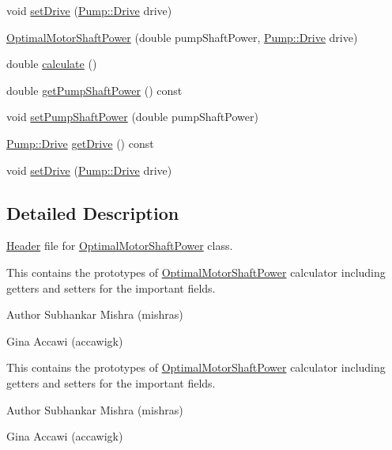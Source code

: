 \begin{DoxyCompactItemize}
\item 
void \hyperlink{class_optimal_motor_shaft_power_abd88cbdcba70dbb194a8f957b4467fc7}{set\+Drive} (\hyperlink{class_pump_a32bf0ade131a11bb3b3fb374f638e983}{Pump\+::\+Drive} drive)
\item 
\hyperlink{class_optimal_motor_shaft_power_a5b793114a451ef9fe7a29f9db9f44bb6}{Optimal\+Motor\+Shaft\+Power} (double pump\+Shaft\+Power, \hyperlink{class_pump_a32bf0ade131a11bb3b3fb374f638e983}{Pump\+::\+Drive} drive)
\item 
double \hyperlink{class_optimal_motor_shaft_power_a34d47733928ae518fa6f3d08b7d8a12e}{calculate} ()
\item 
double \hyperlink{class_optimal_motor_shaft_power_aca7bb632c659ecf2ebf3cb9fdb23626f}{get\+Pump\+Shaft\+Power} () const
\item 
void \hyperlink{class_optimal_motor_shaft_power_ab2d80927fbaa62705359700b2a8f2f26}{set\+Pump\+Shaft\+Power} (double pump\+Shaft\+Power)
\item 
\hyperlink{class_pump_a32bf0ade131a11bb3b3fb374f638e983}{Pump\+::\+Drive} \hyperlink{class_optimal_motor_shaft_power_a23e1045bb2e3ee62205276cbbebbc3ad}{get\+Drive} () const
\item 
void \hyperlink{class_optimal_motor_shaft_power_abd88cbdcba70dbb194a8f957b4467fc7}{set\+Drive} (\hyperlink{class_pump_a32bf0ade131a11bb3b3fb374f638e983}{Pump\+::\+Drive} drive)
\end{DoxyCompactItemize}


\subsection{Detailed Description}
\hyperlink{class_header}{Header} file for \hyperlink{class_optimal_motor_shaft_power}{Optimal\+Motor\+Shaft\+Power} class. 

This contains the prototypes of \hyperlink{class_optimal_motor_shaft_power}{Optimal\+Motor\+Shaft\+Power} calculator including getters and setters for the important fields.

\begin{DoxyAuthor}{Author}
Subhankar Mishra (mishras) 

Gina Accawi (accawigk) 
\end{DoxyAuthor}


This contains the prototypes of \hyperlink{class_optimal_motor_shaft_power}{Optimal\+Motor\+Shaft\+Power} calculator including getters and setters for the important fields.

\begin{DoxyAuthor}{Author}
Subhankar Mishra (mishras) 

Gina Accawi (accawigk) 
\end{DoxyAuthor}


